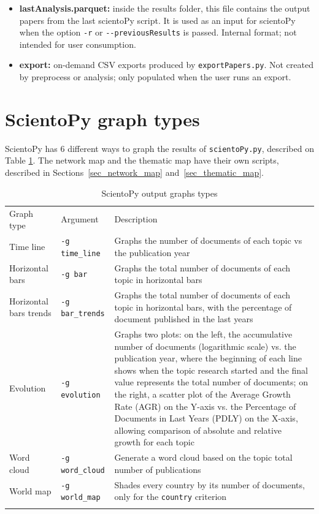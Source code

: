 \documentclass[10pt,letterpaper]{article}
\begin{document}
\begin{itemize}
	\item \textbf{lastAnalysis.parquet: } inside the results folder, this file contains the output papers from the last scientoPy script. It is used as an input for scientoPy when the option \verb|-r| or \verb|--previousResults| is passed. Internal format; not intended for user consumption.

	\item \textbf{export: } on-demand CSV exports produced by \verb|exportPapers.py|. Not created by preprocess or analysis; only populated when the user runs an export.
\end{itemize}

\newpage
\section{ScientoPy graph types}

ScientoPy has 6 different ways to graph the results of \verb|scientoPy.py|, described on Table \ref{table_graph_types}. The network map and the thematic map have their own scripts, described in Sections~\ref{sec_network_map} and~\ref{sec_thematic_map}.

\begin{table}[!h]
	\centering
	\caption{ScientoPy output graphs types}
	\label{table_graph_types}

	\renewcommand{\arraystretch}{1.5}
	\begin{tabular}{ p{4cm} p{3cm} p{10cm}}
	\hline\noalign{\smallskip}
	Graph type     &  Argument & Description                             \\
	\noalign{\smallskip}\hline\noalign{\smallskip}                                                                         
	Time line      & \verb|-g time_line| & Graphs the number of documents of each topic vs the publication year \\
	Horizontal bars  & \verb|-g bar| & Graphs the total number of documents of each topic in horizontal bars \\
	Horizontal bars trends  & \verb|-g bar_trends| & Graphs the total number of documents of each topic in horizontal bars, with the percentage of document published in the last years \\
	Evolution     & \verb|-g evolution| & Graphs two plots: on the left, the accumulative number of documents (logarithmic scale) vs. the publication year, where the beginning of each line shows when the topic research started and the final value represents the total number of documents; on the right, a scatter plot of the Average Growth Rate (AGR) on the Y-axis vs. the Percentage of Documents in Last Years (PDLY) on the X-axis, allowing comparison of absolute and relative growth for each topic \\
	Word cloud     & \verb|-g word_cloud| & Generate a word cloud based on the topic total number of publications \\
	World map     & \verb|-g world_map| & Shades every country by its number of documents, only for the \verb|country| criterion \\
	\noalign{\smallskip}\hline
	\end{tabular}
\end{table}
\end{document}
